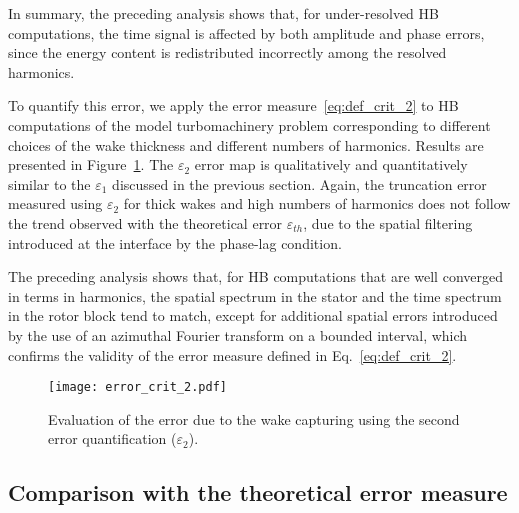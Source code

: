 In summary, the preceding analysis shows that, 
for under-resolved HB computations, the time 
signal is affected by both amplitude and phase errors, 
since the energy content is redistributed incorrectly 
among the resolved harmonics.

To quantify this error, we apply the error measure~\eqref{eq:def_crit_2}
to HB computations of the model turbomachinery 
problem corresponding to different choices 
of the wake thickness and different numbers of 
harmonics. Results are presented in Figure~\ref{fig:crit_2_3d}.
The $\varepsilon_2$ error map is qualitatively 
and quantitatively similar to the $\varepsilon_1$ 
discussed in the previous section. 
Again, the truncation error measured using $\varepsilon_2$ 
for thick wakes and high numbers of harmonics 
does not follow the trend observed with the 
theoretical error $\varepsilon_{th}$, 
due to the spatial filtering introduced at the 
interface by the phase-lag condition.

The preceding analysis shows that, for HB computations 
that are well converged in terms in harmonics, 
the spatial spectrum in the stator and the 
time spectrum in the rotor block tend to match, 
except for additional spatial errors introduced
by the use of an azimuthal Fourier transform on a 
bounded interval, which confirms the 
validity of the error measure defined in Eq.~\eqref{eq:def_crit_2}.
\begin{figure}[htp]
   \centering \texttt{[image: error\_crit\_2.pdf]}
  \caption{Evaluation of the error due to the wake 
  capturing using the second error quantification ($\varepsilon_2$).}
  \label{fig:crit_2_3d}
\end{figure}

\subsection{Comparison with the theoretical error measure}
\label{sub:comp_w_analytic}



